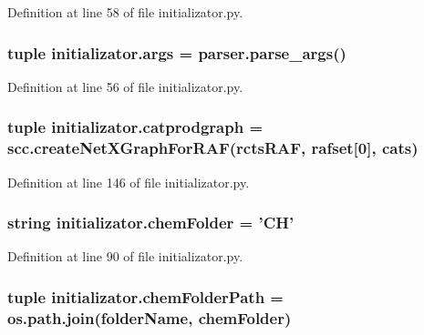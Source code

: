 Definition at line 58 of file initializator.\+py.

\hypertarget{a00137_aedb2e5b77a354ccd69d9d38b3c30f61a}{
\subsubsection[{args}]{\setlength{\rightskip}{0pt plus 5cm}tuple initializator.\+args = parser.\+parse\+\_\+args()}}\label{a00137_aedb2e5b77a354ccd69d9d38b3c30f61a}


Definition at line 56 of file initializator.\+py.

\hypertarget{a00137_ae879083e010a0e2af0a12a7d953a6e8b}{
\subsubsection[{catprodgraph}]{\setlength{\rightskip}{0pt plus 5cm}tuple initializator.\+catprodgraph = scc.\+create\+Net\+X\+Graph\+For\+R\+A\+F({\bf rcts\+R\+A\+F}, {\bf rafset}\mbox{[}0\mbox{]}, cats)}}\label{a00137_ae879083e010a0e2af0a12a7d953a6e8b}


Definition at line 146 of file initializator.\+py.

\hypertarget{a00137_a4a57e1e8a830824b985f34ee1af52b93}{
\subsubsection[{chem\+Folder}]{\setlength{\rightskip}{0pt plus 5cm}string initializator.\+chem\+Folder = 'C\+H'}}\label{a00137_a4a57e1e8a830824b985f34ee1af52b93}


Definition at line 90 of file initializator.\+py.

\hypertarget{a00137_a633d7089af5a033807ccba3b7e9ad483}{
\subsubsection[{chem\+Folder\+Path}]{\setlength{\rightskip}{0pt plus 5cm}tuple initializator.\+chem\+Folder\+Path = os.\+path.\+join({\bf folder\+Name}, {\bf chem\+Folder})}}\label{a00137_a633d7089af5a033807ccba3b7e9ad483}


